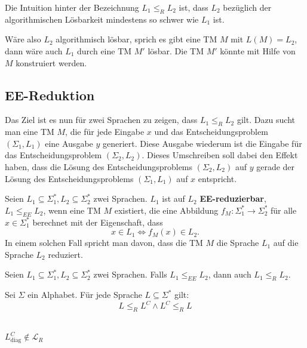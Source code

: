 Die Intuition hinter der Bezeichnung \( L_1 \leq_R L_2 \) ist, dass \( L_2 \) bezüglich der algorithmischen Lösbarkeit mindestens so schwer wie \( L_1 \) ist.

Wäre also \( L_2 \) algorithmisch lösbar, sprich es gibt eine TM \(M\) mit \(L(M) = L_2\), dann wäre auch \(L_1\) durch eine TM \(M'\) lösbar. Die TM \(M'\) könnte mit Hilfe von \(M\) konstruiert werden.

\subsection{EE-Reduktion}
Das Ziel ist es nun für zwei Sprachen zu zeigen, dass \(L_1 \leq_R L_2\) gilt. Dazu sucht man eine TM \(M\), die für jede Eingabe \(x\) und das Entscheidungsproblem \((\Sigma_1, L_1)\) eine Ausgabe \(y\) generiert. Diese Ausgabe wiederum ist die Eingabe für das Entscheidungsproblem \((\Sigma_2, L_2)\).  Dieses Umschreiben soll dabei den Effekt haben, dass die Lösung des Entscheidungsproblems \((\Sigma_2, L_2)\) auf \(y\) gerade der Lösung des Entscheidungsproblems \((\Sigma_1, L_1)\) auf \(x\) entspricht.\\

\begin{definition}
Seien \(L_1 \subseteq \Sigma_1^*, L_2 \subseteq \Sigma_2^*\) zwei Sprachen. \(L_1\) ist auf \(L_2\) \textbf{EE-reduzierbar}, \(L_1 \leq_{EE} L_2\), wenn eine TM \(M\) existiert, die eine Abbildung \(f_M: \Sigma_1^* \to \Sigma_2^*\) für alle \(x \in \Sigma_1^*\) berechnet mit der Eigenschaft, dass \[x \in L_1 \Leftrightarrow f_M(x) \in L_2.\] In einem solchen Fall spricht man davon, dass die TM \(M\) die Sprache \(L_1\) auf die Sprache \(L_2\) reduziert.\\
\end{definition}

\begin{lemma}
Seien \( L_1 \subseteq \Sigma_1^*, L_2 \subseteq \Sigma_2^* \) zwei Sprachen. Falls \( L_1 \leq_{EE} L_2 \), dann auch \( L_1 \leq_R L_2 \).\\
\end{lemma}

\begin{lemma}
Sei \( \Sigma \) ein Alphabet. Für jede Sprache \( L \subseteq \Sigma^* \) gilt: \[ L \leq_R L^C \land L^C \leq_R L \]\\
\end{lemma}


\begin{corollary}
\( L_\text{diag}^C \notin \mathcal{L}_R \)\\
\end{corollary}

